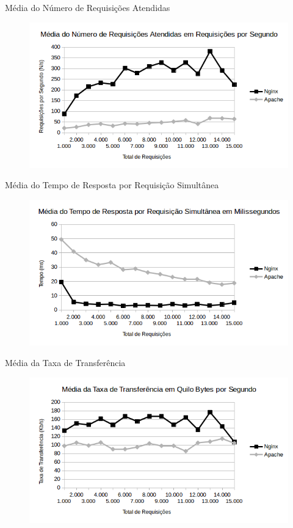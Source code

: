 \begin{frame}{Média do Número de Requisições Atendidas}
	\begin{figure}
		\centering
		\includegraphics[width=1\linewidth]{../graficos/grafico4} 
	\end{figure}
\end{frame}

\begin{frame}{Média do Tempo de Resposta por Requisição Simultânea}
	\begin{figure}
		\centering
		\includegraphics[width=1\linewidth]{../graficos/grafico5} 
	\end{figure}
\end{frame}

\begin{frame}{Média da Taxa de Transferência}
	\begin{figure}
		\centering
		\includegraphics[width=1\linewidth]{../graficos/grafico6} 
	\end{figure}
\end{frame}


